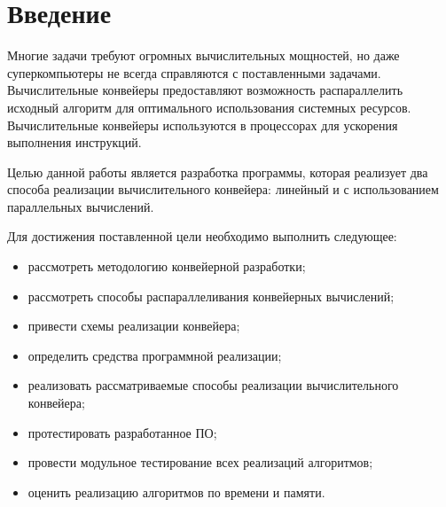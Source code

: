 \newpage
{}

\chapter*{Введение}
Многие задачи требуют огромных вычислительных мощностей, но даже суперкомпьютеры не всегда справляются с поставленными задачами.
Вычислительные конвейеры предоставляют возможность распараллелить исходный алгоритм для оптимального использования системных ресурсов.
Вычислительные конвейеры используются в процессорах для ускорения выполнения инструкций.

Целью данной работы является разработка программы, которая реализует два способа реализации
вычислительного конвейера: линейный и с использованием параллельных вычислений.

Для достижения поставленной цели необходимо выполнить следующее:
\begin{itemize}
	\item рассмотреть методологию конвейерной разработки;
	\item рассмотреть способы распараллеливания конвейерных вычислений;
	\item привести схемы реализации конвейера;
	\item определить средства программной реализации;
	\item реализовать рассматриваемые способы реализации вычислительного конвейера;
	\item протестировать разработанное ПО;
	\item провести модульное тестирование всех реализаций алгоритмов;
	\item оценить реализацию алгоритмов по времени и памяти.
\end{itemize}